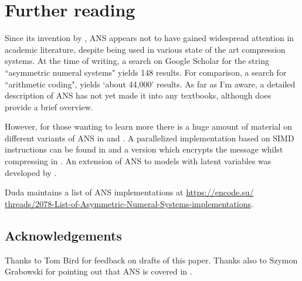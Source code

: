 \documentclass{article}
\theoremstyle{definition}
\begin{document}
\section{Further reading}
Since its invention by \citet{duda2009}, ANS appears not to have gained
widespread attention in academic literature, despite being used in various
state of the art compression systems. At the time of writing, a search on
Google Scholar for the string ``asymmetric numeral systems" yields 148 results.
For comparison, a search for ``arithmetic coding", yields `about 44,000'
results. As far as I'm aware, a detailed description of ANS has not yet made it
into any textbooks, although \citet{mcanlis2016} does provide a brief overview.

However, for those wanting to learn more there is a huge amount of material on
different variants of ANS in \citet{duda2009} and \citet{duda2015}. A
parallelized implementation based on SIMD instructions can be found in
\citet{giesen2014} and a version which encrypts the message whilst compressing
in \citet{duda2016}.  An extension of ANS to models with latent variables was
developed by \citet{townsend2019}.

Duda maintains a list of ANS implementations at
\url{
  https://encode.su/
  threads/2078-List-of-Asymmetric-Numeral-Systems-implementations}.

\subsection*{Acknowledgements}
  Thanks to Tom Bird for feedback on drafts of this paper. Thanks also to
  Szymon Grabowski for pointing out that ANS is covered in \citet{mcanlis2016}.

\printbibliography
\end{document}

